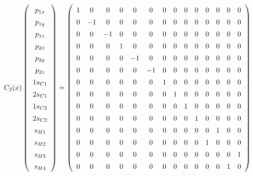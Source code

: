 \documentclass[9pt]{report}
\begin{document}
\normalsize




\scriptsize
\begin{equation}
C_{2}(x)
\renewcommand{\arraystretch}{1.4}
\left(\begin{array}{c} p_{1x}  \\  p_{1y}  \\  p_{1z}  \\  p_{2x}  \\ p_{2y} \\  p_{2z}  \\  1s_{C1}  \\  2s_{C1}  \\  1s_{C2}  \\  2s_{C2}  \\  s_{H1}  \\  s_{H2}  \\  s_{H3}  \\  s_{H4}   \\\end{array}\right)
=
\left(\begin{array}{cccccccccccccc}
1 & 0 & 0 & 0 & 0 & 0 & 0 & 0 & 0 & 0 & 0 & 0 & 0 & 0
\\
0 & -1 & 0 & 0 & 0 & 0 & 0 & 0 & 0 & 0 & 0 & 0 & 0 & 0
\\
0 & 0 & -1 & 0 & 0 & 0 & 0 & 0 & 0 & 0 & 0 & 0 & 0 & 0
\\
0 & 0 & 0 & 1 & 0 & 0 & 0 & 0 & 0 & 0 & 0 & 0 & 0 & 0
\\
0 & 0 & 0 & 0 & -1 & 0 & 0 & 0 & 0 & 0 & 0 & 0 & 0 & 0
\\
0 & 0 & 0 & 0 & 0 & -1 & 0 & 0 & 0 & 0 & 0 & 0 & 0 & 0
\\
0 & 0 & 0 & 0 & 0 & 0 & 1 & 0 & 0 & 0 & 0 & 0 & 0 & 0
\\
0 & 0 & 0 & 0 & 0 & 0 & 0 & 1 & 0 & 0 & 0 & 0 & 0 & 0
\\
0 & 0 & 0 & 0 & 0 & 0 & 0 & 0 & 1 & 0 & 0 & 0 & 0 & 0
\\
0 & 0 & 0 & 0 & 0 & 0 & 0 & 0 & 0 & 1 & 0 & 0 & 0 & 0
\\
0 & 0 & 0 & 0 & 0 & 0 & 0 & 0 & 0 & 0 & 0 & 1 & 0 & 0
\\
0 & 0 & 0 & 0 & 0 & 0 & 0 & 0 & 0 & 0 & 1 & 0 & 0 & 0
\\
0 & 0 & 0 & 0 & 0 & 0 & 0 & 0 & 0 & 0 & 0 & 0 & 0 & 1
\\
0 & 0 & 0 & 0 & 0 & 0 & 0 & 0 & 0 & 0 & 0 & 0 & 1 & 0
\\\end{array}\right)

\end{equation}
\end{document}
